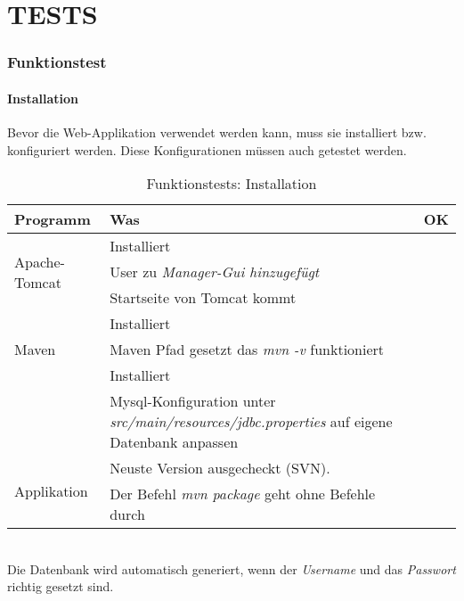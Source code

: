 \part{TESTS}
%
\newpage
%
\section{Funktionstest}
\subsection{Installation}
Bevor die Web-Applikation verwendet werden kann, muss sie installiert bzw. konfiguriert werden.
Diese Konfigurationen müssen auch getestet werden.
%
\begin{table}[ht]
\caption{Funktionstests: Installation}
\begin{tabular}{p{5cm}p{8cm}| p{1cm}}
  \toprule
  \textbf{Programm} & \textbf{Was} &  \textbf{OK}\\
  \midrule
  \multirow{3}{*}{Apache-Tomcat} & Installiert & \\
   \cmidrule{2-3}
   & User zu \textit{Manager-Gui hinzugefügt} & \\
   \cmidrule{2-3}
   & Startseite von Tomcat kommt & \\
  \midrule
  \multirow{3}{*}{Maven} & Installiert & \\
   \cmidrule{2-3}
   & Maven Pfad gesetzt das \textit{mvn -v} funktioniert & \\
  \midrule
  \multirow{3}{*}{Mysql} & Installiert & \\
   \cmidrule{2-3}
   & Mysql-Konfiguration unter \textit{src/main/resources/jdbc.properties} auf eigene Datenbank anpassen & \\
  \midrule
  \multirow{3}{*}{Applikation} & Neuste Version ausgecheckt (SVN). & \\
   \cmidrule{2-3}
   & Der Befehl  \textit{mvn package} geht ohne Befehle durch & \\
  \bottomrule
\end{tabular}
\end{table}
\\Die Datenbank wird automatisch generiert, wenn der \textit{Username} und das \textit{Passwort} richtig gesetzt sind.
%
\newpage
%
